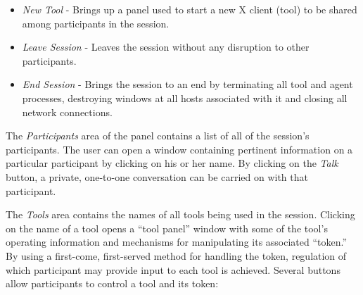 \begin{itemize}

\item {\it New Tool} - Brings up a panel used to start a new X client
(tool) to be shared among participants in the session.
\item {\it Leave Session} - Leaves the session without any disruption to
other participants.
\item {\it End Session} - Brings the session to an end by terminating
all tool and agent processes, destroying windows at all hosts
associated with it and closing all network connections.
\end{itemize}

The {\it Participants} area of the panel contains a list of all of the
session's participants.  The user can open a window containing
pertinent information on a particular participant by clicking on his or
her name.  By clicking on the {\it Talk} button, a private, one-to-one
conversation can be carried on with that participant.

The {\it Tools} area contains the names of all tools being used in the
session.  Clicking on the name of a tool opens a ``tool panel'' window
with some of the tool's operating information and mechanisms for
manipulating its associated ``token.''  By using a first-come,
first-served method for handling the token, regulation of which
participant may provide input to each tool is achieved.  Several
buttons allow participants to control a tool and its token:

